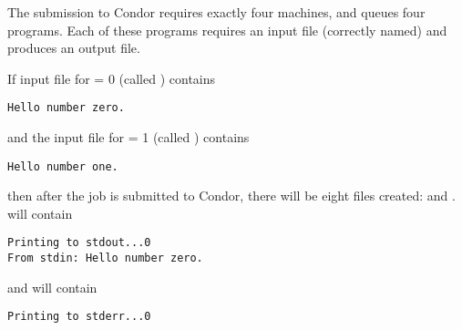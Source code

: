 The submission to Condor requires exactly four machines,
and queues four programs.
Each of these programs requires an input file (correctly
named) and produces an output file.

If input file for  = 0 (called ) contains
\begin{verbatim}
Hello number zero.
\end{verbatim}
and
the input file for  = 1 (called ) contains
\begin{verbatim}
Hello number one.
\end{verbatim}
then after the job is submitted to Condor,
there will be 
eight files created:  
 and .
 will contain
\begin{verbatim}
Printing to stdout...0
From stdin: Hello number zero.
\end{verbatim}
and  will contain
\begin{verbatim}
Printing to stderr...0
\end{verbatim}

